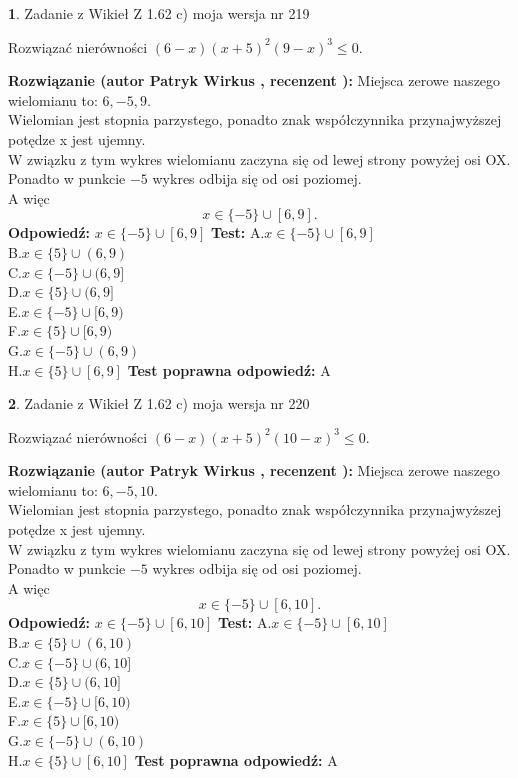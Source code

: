 \documentclass[12pt, a4paper]{article}
\theoremstyle{definition} %
\newtheorem{zad}{}
\newcommand{\zadStart}[1]{\begin{zad}#1\newline}
\newcommand{\zadStop}{\end{zad}}
\newcommand{\rozwStart}[2]{\noindent \textbf{Rozwiązanie (autor #1 , recenzent #2): }\newline}
\newcommand{\rozwStop}{\newline}
\newcommand{\odpStart}{\noindent \textbf{Odpowiedź:}\newline}
\newcommand{\odpStop}{\newline}
\newcommand{\testStart}{\noindent \textbf{Test:}\newline}
\newcommand{\testStop}{\newline}
\newcommand{\kluczStart}{\noindent \textbf{Test poprawna odpowiedź:}\newline}
\newcommand{\kluczStop}{\newline}
\begin{document}
\zadStart{Zadanie z Wikieł Z 1.62 c) moja wersja nr 219}

Rozwiązać nierówności $(6-x)(x+5)^{2}(9-x)^{3}\le0$.
\zadStop
\rozwStart{Patryk Wirkus}{}
Miejsca zerowe naszego wielomianu to: $6, -5, 9$.\\
Wielomian jest stopnia parzystego, ponadto znak współczynnika przy\linebreak najwyższej potędze x jest ujemny.\\ W związku z tym wykres wielomianu zaczyna się od lewej strony powyżej osi OX.\\
Ponadto w punkcie $-5$ wykres odbija się od osi poziomej.\\
A więc $$x \in \{-5\} \cup [6,9].$$
\rozwStop
\odpStart
$x \in \{-5\} \cup [6,9]$
\odpStop
\testStart
A.$x \in \{-5\} \cup [6,9]$\\
B.$x \in \{5\} \cup (6,9)$\\
C.$x \in \{-5\} \cup (6,9]$\\
D.$x \in \{5\} \cup (6,9]$\\
E.$x \in \{-5\} \cup [6,9)$\\
F.$x \in \{5\} \cup [6,9)$\\
G.$x \in \{-5\} \cup (6,9)$\\
H.$x \in \{5\} \cup [6,9]$
\testStop
\kluczStart
A
\kluczStop



\zadStart{Zadanie z Wikieł Z 1.62 c) moja wersja nr 220}

Rozwiązać nierówności $(6-x)(x+5)^{2}(10-x)^{3}\le0$.
\zadStop
\rozwStart{Patryk Wirkus}{}
Miejsca zerowe naszego wielomianu to: $6, -5, 10$.\\
Wielomian jest stopnia parzystego, ponadto znak współczynnika przy\linebreak najwyższej potędze x jest ujemny.\\ W związku z tym wykres wielomianu zaczyna się od lewej strony powyżej osi OX.\\
Ponadto w punkcie $-5$ wykres odbija się od osi poziomej.\\
A więc $$x \in \{-5\} \cup [6,10].$$
\rozwStop
\odpStart
$x \in \{-5\} \cup [6,10]$
\odpStop
\testStart
A.$x \in \{-5\} \cup [6,10]$\\
B.$x \in \{5\} \cup (6,10)$\\
C.$x \in \{-5\} \cup (6,10]$\\
D.$x \in \{5\} \cup (6,10]$\\
E.$x \in \{-5\} \cup [6,10)$\\
F.$x \in \{5\} \cup [6,10)$\\
G.$x \in \{-5\} \cup (6,10)$\\
H.$x \in \{5\} \cup [6,10]$
\testStop
\kluczStart
A
\kluczStop
\end{document}
